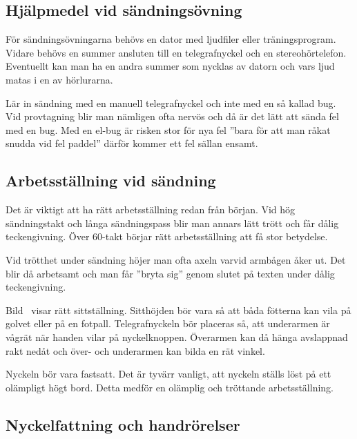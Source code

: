 \subsection[Övningshjälpmedel]{Hjälpmedel vid sändningsövning}

För sändningsövningarna behövs en dator med ljudfiler eller träningsprogram.
Vidare behövs en summer ansluten till en telegrafnyckel och en stereohörtelefon.
Eventuellt kan man ha en andra summer som nycklas av datorn och vars ljud matas
i en av hörlurarna.

Lär in sändning med en manuell telegrafnyckel och inte med en så kallad bug.
Vid provtagning blir man nämligen ofta nervös och då är det lätt att sända fel
med en bug.
Med en el-bug är risken stor för nya fel ''bara för att man råkat snudda vid fel
paddel'' därför kommer ett fel sällan ensamt.


\subsection[Ställning]{Arbetsställning vid sändning}

Det är viktigt att ha rätt arbetsställning redan från början.
Vid hög sändningstakt och långa sändningspass blir man annars lätt trött och
får dålig teckengivning.
Över 60-takt börjar rätt arbetsställning att få stor betydelse.

Vid trötthet under sändning höjer man ofta axeln varvid armbågen åker ut.
Det blir då arbetsamt och man får ''bryta sig'' genom slutet på texten under
dålig teckengivning.

Bild~ visar rätt sittställning.
Sitthöjden bör vara så att båda fötterna kan vila på golvet eller på en fotpall.
Telegrafnyckeln bör placeras så, att underarmen är vågrät när handen vilar på
nyckelknoppen.
Överarmen kan då hänga avslappnad rakt nedåt och över- och underarmen kan bilda
en rät vinkel.

Nyckeln bör vara fastsatt.
Det är tyvärr vanligt, att nyckeln ställs löst på ett olämpligt högt bord.
Detta medför en olämplig och tröttande arbetsställning.

\subsection[Fattning]{Nyckelfattning och handrörelser}

